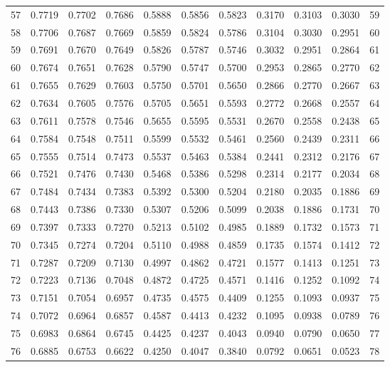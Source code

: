 \documentclass[12pt]{article}
\begin{document}
\begin{longtable}{rrrrrrrrrrr}
  57 & 0.7719 & 0.7702 & 0.7686 & 0.5888 & 0.5856 & 0.5823 & 0.3170 & 0.3103 & 0.3030 & 59 \\ 
  58 & 0.7706 & 0.7687 & 0.7669 & 0.5859 & 0.5824 & 0.5786 & 0.3104 & 0.3030 & 0.2951 & 60 \\ 
  59 & 0.7691 & 0.7670 & 0.7649 & 0.5826 & 0.5787 & 0.5746 & 0.3032 & 0.2951 & 0.2864 & 61 \\ 
  60 & 0.7674 & 0.7651 & 0.7628 & 0.5790 & 0.5747 & 0.5700 & 0.2953 & 0.2865 & 0.2770 & 62 \\ 
  61 & 0.7655 & 0.7629 & 0.7603 & 0.5750 & 0.5701 & 0.5650 & 0.2866 & 0.2770 & 0.2667 & 63 \\ 
  62 & 0.7634 & 0.7605 & 0.7576 & 0.5705 & 0.5651 & 0.5593 & 0.2772 & 0.2668 & 0.2557 & 64 \\ 
  63 & 0.7611 & 0.7578 & 0.7546 & 0.5655 & 0.5595 & 0.5531 & 0.2670 & 0.2558 & 0.2438 & 65 \\ 
  64 & 0.7584 & 0.7548 & 0.7511 & 0.5599 & 0.5532 & 0.5461 & 0.2560 & 0.2439 & 0.2311 & 66 \\ 
  65 & 0.7555 & 0.7514 & 0.7473 & 0.5537 & 0.5463 & 0.5384 & 0.2441 & 0.2312 & 0.2176 & 67 \\ 
  66 & 0.7521 & 0.7476 & 0.7430 & 0.5468 & 0.5386 & 0.5298 & 0.2314 & 0.2177 & 0.2034 & 68 \\ 
  67 & 0.7484 & 0.7434 & 0.7383 & 0.5392 & 0.5300 & 0.5204 & 0.2180 & 0.2035 & 0.1886 & 69 \\ 
  68 & 0.7443 & 0.7386 & 0.7330 & 0.5307 & 0.5206 & 0.5099 & 0.2038 & 0.1886 & 0.1731 & 70 \\ 
  69 & 0.7397 & 0.7333 & 0.7270 & 0.5213 & 0.5102 & 0.4985 & 0.1889 & 0.1732 & 0.1573 & 71 \\ 
  70 & 0.7345 & 0.7274 & 0.7204 & 0.5110 & 0.4988 & 0.4859 & 0.1735 & 0.1574 & 0.1412 & 72 \\ 
  71 & 0.7287 & 0.7209 & 0.7130 & 0.4997 & 0.4862 & 0.4721 & 0.1577 & 0.1413 & 0.1251 & 73 \\ 
  72 & 0.7223 & 0.7136 & 0.7048 & 0.4872 & 0.4725 & 0.4571 & 0.1416 & 0.1252 & 0.1092 & 74 \\ 
  73 & 0.7151 & 0.7054 & 0.6957 & 0.4735 & 0.4575 & 0.4409 & 0.1255 & 0.1093 & 0.0937 & 75 \\ 
  74 & 0.7072 & 0.6964 & 0.6857 & 0.4587 & 0.4413 & 0.4232 & 0.1095 & 0.0938 & 0.0789 & 76 \\ 
  75 & 0.6983 & 0.6864 & 0.6745 & 0.4425 & 0.4237 & 0.4043 & 0.0940 & 0.0790 & 0.0650 & 77 \\ 
  76 & 0.6885 & 0.6753 & 0.6622 & 0.4250 & 0.4047 & 0.3840 & 0.0792 & 0.0651 & 0.0523 & 78 \\ 

\end{longtable}
\end{document}
